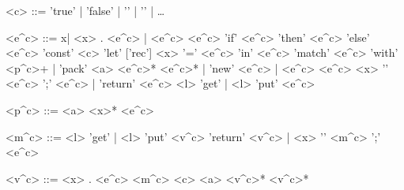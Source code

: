 \documentclass{article}
\newcommand{\coree}{e^{c}}
\newcommand{\coreval}{v^{c}}
\newcommand{\corepat}{p^{c}}
\newcommand{\corevar}{x}
\newcommand{\coreadt}{a}
\newcommand{\coremonad}{m^{c}}
\begin{document}
\begin{displaygrammar}
<c> ::= 'true' | 'false' | '' | '' | \ldots

<\coree> ::= \corevar | \lambda <\corevar> . <\coree> | <\coree> <\coree>
       \alt 'if' <\coree> 'then' <\coree> 'else' <\coree>
       \alt 'const' <c>
       \alt 'let' ['rec'] <\corevar> '=' <\coree> 'in' <\coree>
       \alt 'match' <\coree> 'with' <\corepat>+ | 'pack' <\coreadt> <\coree>*
       \alt \llbracket <\coree>* \rrbracket | 'new' <\coree> | <\coree> \bropT <\coree> \brclT
       \alt <\corevar> '\leftarrow' <\coree> ';' <\coree> | 'return' <\coree> 
       \alt <l> \bullet 'get' | <l> \bullet 'put' <\coree>

<\corepat> ::= <\coreadt> <\corevar>* <\coree>

<\coremonad> ::= <l> \bullet 'get' | <l> \bullet 'put' <\coreval> 
                 \alt 'return' <\coreval> | <\corevar> '\leftarrow' <\coremonad> ';' <\coree> 

<\coreval> ::= \lambda <\corevar> . <\coree> 
               \alt <\coremonad>
               \alt <c>
               \alt <\coreadt> <\coreval>*
               \alt \bropT <\coreval>* \brclT
               
\end{displaygrammar}
\end{document}

